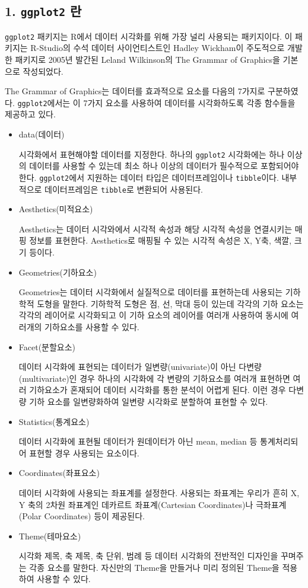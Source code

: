 \documentclass[
]{article}
\begin{document}
\hypertarget{ggplot2-uxb780}{%
\subsection{\texorpdfstring{1. \texttt{ggplot2} 란}{1. ggplot2 란}}\label{ggplot2-uxb780}}

\texttt{ggplot2} 패키지는 R에서 데이터 시각화를 위해 가장 널리 사용되는 패키지이다. 이 패키지는 R-Studio의 수석 데이터 사이언티스트인 Hadley Wickham이 주도적으로 개발한 패키지로 2005년 발간된 Leland Wilkinson의 The Grammar of Graphics을 기본으로 작성되었다.

The Grammar of Graphics는 데이터를 효과적으로 요소를 다음의 7가지로 구분하였다. \texttt{ggplot2}에서는 이 7가지 요소를 사용하여 데이터를 시각화하도록 각종 함수들을 제공하고 있다.

\begin{itemize}
\item
  data(데이터)

  시각화에서 표현해야할 데이터를 지정한다. 하나의 \texttt{ggplot2} 시각화에는 하나 이상의 데이터를 사용할 수 있는데 최소 하나 이상의 데이터가 필수적으로 포함되어야 한다. \texttt{ggplot2}에서 지원하는 데이터 타입은 데이터프레임이나 \texttt{tibble}이다. 내부적으로 데이터프레임은 \texttt{tibble}로 변환되어 사용된다.
\item
  Aesthetics(미적요소)

  Aesthetics는 데이터 시각와에서 시각적 속성과 해당 시각적 속성을 연결시키는 매핑 정보를 표현한다. Aesthetics로 매핑될 수 있는 시각적 속성은 X, Y축, 색깔, 크기 등이다.
\item
  Geometries(기하요소)

  Geometries는 데이터 시각화에서 실질적으로 데이터를 표현하는데 사용되는 기하학적 도형을 말한다. 기하학적 도형은 점, 선, 막대 등이 있는데 각각의 기하 요소는 각각의 레이어로 시각화되고 이 기하 요소의 레이어를 여러개 사용하여 동시에 여러개의 기하요소를 사용할 수 있다.
\item
  Facet(분할요소)

  데이터 시각화에 표현되는 데이터가 일변량(univariate)이 아닌 다변량(multivariate)인 경우 하나의 시각화에 각 변량의 기하요소를 여러개 표현하면 여러 기하요소가 혼재되어 데이터 시각화를 통한 분석이 어렵게 된다. 이런 경우 다변량 기하 요소를 일변량화하여 일변량 시각화로 분할하여 표현할 수 있다.
\item
  Statistics(통계요소)

  데이터 시각화에 표현될 데이터가 원데이터가 아닌 mean, median 등 통계처리되어 표현할 경우 사용되는 요소이다.
\item
  Coordinates(좌표요소)

  데이터 시각화에 사용되는 좌표계를 설정한다. 사용되는 좌표계는 우리가 흔히 X, Y 축의 2차원 좌표계인 데카르트 좌표계(Cartesian Coordinates)나 극좌표계(Polar Coordinates) 등이 제공된다.
\item
  Theme(테마요소)

  시각화 제목, 축 제목, 축 단위, 범례 등 데이터 시각화의 전반적인 디자인을 꾸며주는 각종 요소를 말한다. 자신만의 Theme을 만들거나 미리 정의된 Theme을 적용하여 사용할 수 있다.
\end{itemize}
\end{document}
